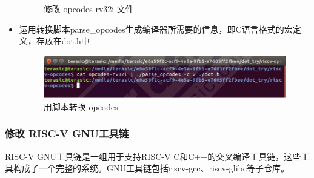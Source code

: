 \documentclass[a4paper, 14pt, oneside]{book} %
\numberwithin{equation}{subsection}
\begin{document}
\begin{itemize}
\begin{figure}[H]
					\caption{修改 opcodes-rv32i 文件}
				\end{figure}
			\item 运用转换脚本parse\_opcodes生成编译器所需要的信息，即C语言格式的宏定义，存放在dot.h中
				\begin{figure}[H]
					\centering  
					\includegraphics[scale=0.8]{img/changeopcodes.JPG} 
					\caption{用脚本转换 opcodes}
				\end{figure}
		\end{itemize}
	
		\subsubsection{修改 RISC-V GNU工具链}
		RISC-V GNU工具链是一组用于支持RISC-V C和C++的交叉编译工具链，这些工具构成了一个完整的系统。GNU工具链包括riscv-gcc、riscv-glibc等子仓库。
\end{document}
